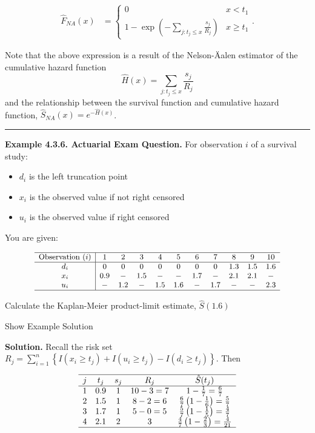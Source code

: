\documentclass[]{book}
\providecommand{\tightlist}{%
  \setlength{\itemsep}{0pt}\setlength{\parskip}{0pt}}
\theoremstyle{definition}
\theoremstyle{definition}
\theoremstyle{definition}
\theoremstyle{remark}
\begin{document}
\[
\begin{aligned}
\hat{F}_{NA}(x) &=
\left\{
\begin{array}{ll}
0 & x<t_{1} \\
1- \exp \left(-\sum_{j:t_{j} \leq x}\frac{s_j}{R_j} \right) & x \geq t_{1} 
\end{array}
\right. .\end{aligned}
\]

Note that the above expression is a result of the Nelson-Äalen estimator
of the cumulative hazard function
\[\hat{H}(x)=\sum_{j:t_j\leq x}  \frac{s_j}{R_j} \] and the relationship
between the survival function and cumulative hazard function,
\(\hat{S}_{NA}(x)=e^{-\hat{H}(x)}\).

\begin{center}\rule{0.5\linewidth}{\linethickness}\end{center}

\textbf{Example 4.3.6. Actuarial Exam Question.} For observation \(i\)
of a survival study:

\begin{itemize}
\tightlist
\item
  \(d_i\) is the left truncation point
\item
  \(x_i\) is the observed value if not right censored
\item
  \(u_i\) is the observed value if right censored
\end{itemize}

You are given:

\[
{\small
\begin{array}{c|cccccccccc}
\hline
\text{Observation } (i) & 1 & 2 & 3 & 4 & 5 & 6 & 7 & 8 & 9 & 10\\ \hline
d_i & 0 & 0 & 0 & 0 & 0 & 0 & 0 & 1.3 & 1.5 & 1.6\\
x_i & 0.9 & - & 1.5 & - & - & 1.7 & - & 2.1 & 2.1 & - \\
u_i & - & 1.2 & - & 1.5 & 1.6 & - & 1.7 & - & - & 2.3 \\
\hline
\end{array}
}
\]

Calculate the Kaplan-Meier product-limit estimate, \(\hat{S}(1.6)\)

Show Example Solution

\hypertarget{toggleExampleSelect.3.6}{}
\textbf{Solution.} Recall the risk set
\(R_j = \sum_{i=1}^n \left\{ I(x_i \geq t_{j}) + I(u_i \geq t_{j}) - I(d_i \geq t_{j}) \right\}\).
Then

\[\begin{array}{ccccc}
\hline
j & t_j & s_j & R_j & \hat{S}(t_j) \\
\hline 
1  & 0.9   & 1   & 10-3 = 7 & 1-\frac{1}{7} = \frac{6}{7} \\
2  & 1.5   & 1   & 8-2 = 6  & \frac{6}{7}\left( 1 - \frac{1}{6} \right) = \frac{5}{7}\\
3  & 1.7   & 1   & 5-0 = 5  & \frac{5}{7}\left( 1 - \frac{1}{5} \right) = \frac{4}{7}\\
4  & 2.1   & 2   & 3        & \frac{4}{7}\left( 1 - \frac{2}{3}\right) = \frac{4}{21}\\
\hline
\end{array}\]
\end{document}
